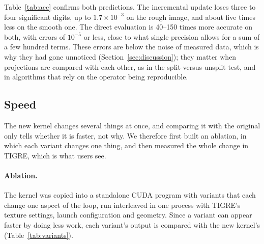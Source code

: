 \documentclass[11pt,a4paper]{article}
\theoremstyle{remark}
\begin{document}
Table~\ref{tab:acc} confirms both predictions. The incremental update loses three to four significant
digits, up to $1.7\times10^{-3}$ on the rough image, and about five times less on the smooth one. The
direct evaluation is 40--150 times more accurate on both, with errors of $10^{-5}$ or less, close to what
single precision allows for a sum of a few hundred terms. These errors are below the noise of measured
data, which is why they had gone unnoticed (Section~\ref{sec:discussion}); they matter when projections are
compared with each other, as in the split-versus-unsplit test, and in algorithms that rely on the operator
being reproducible.

\subsection{Speed}
\label{sec:res-speed}

The new kernel changes several things at once, and comparing it with the original only tells whether it is
faster, not why. We therefore first built an ablation, in which each variant changes one thing, and then
measured the whole change in TIGRE, which is what users see.

\paragraph{Ablation.} The kernel was copied into a standalone CUDA program with variants that each change
one aspect of the loop, run interleaved in one process with TIGRE's texture settings, launch configuration
and geometry. Since a variant can appear faster by doing less work, each variant's output is compared with
the new kernel's (Table~\ref{tab:variants}).
\end{document}
